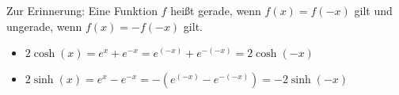 \item Zur Erinnerung: Eine Funktion $f$ heißt gerade, wenn $f(x) =f(-x)$ gilt und ungerade, wenn $f(x) = -f(-x)$ gilt.

\begin{itemize}
	\item $2 \cosh(x) = e^x+e^{-x} =   e^{(-x)} + e^{-(-x)}  = 2  \cosh(-x)$
	\item $2 \sinh(x) = e^x-e^{-x} = -(e^{(-x)} - e^{-(-x)}) = - 2 \sinh(-x)$
\end{itemize}